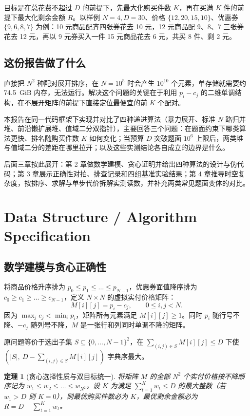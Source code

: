 \documentclass[12pt,a4paper,fontset=windows]{ctexart}
\theoremstyle{plain}
\newtheorem{theorem}{定理}
\begin{document}
目标是在总花费不超过 $D$ 的前提下，先最大化购买件数 $K$，再在买满 $K$ 件的前提下最大化剩余金额 $R$。以样例 $N=4, D=30$、价格 $\{12, 20, 15, 10\}$、优惠券 $\{9, 6, 8, 7\}$ 为例：10 元商品配齐四张券花去 10 元，12 元商品配 9、8、7 三张券花去 12 元，再以 9 元券买入一件 15 元商品花去 6 元，共买 8 件、剩 2 元。

\subsection{这份报告做了什么}

直接把 $N^2$ 种配对展开排序，在 $N=10^5$ 时会产生 $10^{10}$ 个元素，单存储就需要约 74.5~GiB 内存，无法运行。解决这个问题的关键在于利用 $p_i - c_j$ 的二维单调结构，在不展开矩阵的前提下直接定位最便宜的前 $K$ 个配对。

本报告在同一代码框架下实现并对比了四种递进算法（暴力展开、标准 $N$ 路归并堆、前沿懒扩展堆、值域二分双指针），主要回答三个问题：在题面约束下哪类算法更快、排名随购买件数 $K$ 如何变化；当预算 $D$ 突破题面 $10^6$ 上限后，两类堆与值域二分的差距在哪里拉开；以及这些实测结论各自成立的边界是什么。

后面三章按此展开：第 2 章做数学建模、贪心证明并给出四种算法的设计与伪代码；第 3 章展示正确性对拍、排查记录和四组基准实验结果；第 4 章推导时空复杂度，按排序、求解与单步代价拆解实测读数，并补充两类常见题面变体的对比。

\section{Data Structure / Algorithm Specification}

\subsection{数学建模与贪心正确性}

将商品价格升序排为 $p_0 \le p_1 \le \dots \le p_{N-1}$，优惠券面值降序排为 $c_0 \ge c_1 \ge \dots \ge c_{N-1}$，定义 $N \times N$ 的虚拟实付价格矩阵：
\[
M[i][j] = p_i - c_j, \qquad 0 \le i, j < N.
\]
因为 $\max_j c_j < \min_i p_i$，矩阵所有元素满足 $M[i][j] \ge 1$。同时 $p_i$ 随行号不降、$-c_j$ 随列号不降，$M$ 是一张行和列同时单调不降的矩阵。

原问题等价于选出子集 $S \subseteq \{0,\dots,N-1\}^2$，在 $\sum_{(i,j)\in S} M[i][j] \le D$ 下使 $(|S|,\ D-\sum_{(i,j)\in S} M[i][j])$ 字典序最大。

\begin{theorem}[贪心选择性质与双目标统一]
将矩阵 $M$ 的全部 $N^2$ 个实付价格按不降顺序记为 $w_1 \le w_2 \le \dots \le w_{N^2}$。设 $K$ 为满足 $\sum_{t=1}^{K} w_t \le D$ 的最大整数（若 $w_1 > D$ 则 $K=0$），则最优购买件数必为 $K$，最优剩余金额必为 $R = D - \sum_{t=1}^{K} w_t$。
\end{theorem}
\end{document}

